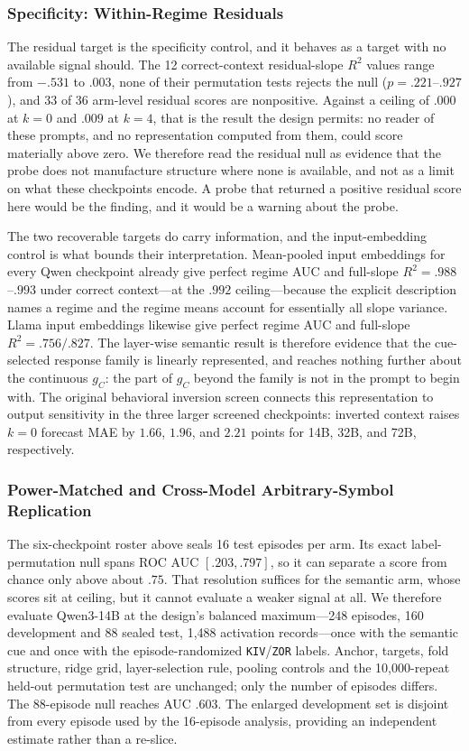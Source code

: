 \subsubsection{Specificity: Within-Regime Residuals}
The residual target is the specificity control, and it behaves as a target with
no available signal should. The 12 correct-context residual-slope $R^2$ values
range from $-.531$ to $.003$, none of their permutation tests rejects the null
($p=.221$--$.927$), and 33 of 36 arm-level residual scores are nonpositive.
Against a ceiling of $.000$ at $k=0$ and $.009$ at $k=4$, that is the result the
design permits: no reader of these prompts, and no representation computed from
them, could score materially above zero. We therefore read the residual null as
evidence that the probe does not manufacture structure where none is available,
and not as a limit on what these checkpoints encode. A probe that returned a
positive residual score here would be the finding, and it would be a warning
about the probe.

The two recoverable targets do carry information, and the input-embedding control
is what bounds their interpretation. Mean-pooled input embeddings for every Qwen
checkpoint already give perfect regime AUC and full-slope $R^2=.988$--$.993$ under
correct context---at the $.992$ ceiling---because the explicit description names a
regime and the regime means account for essentially all slope variance. Llama
input embeddings likewise give perfect regime AUC and full-slope $R^2=.756/.827$.
The layer-wise semantic result is therefore evidence that the cue-selected
response family is linearly represented, and reaches nothing further about the
continuous $g_C$: the part of $g_C$ beyond the family is not in the prompt to
begin with. The original behavioral inversion screen connects this representation
to output sensitivity in the three larger screened checkpoints: inverted context
raises $k=0$ forecast MAE by $1.66$, $1.96$, and $2.21$ points for 14B, 32B, and
72B, respectively.

\subsubsection{Power-Matched and Cross-Model Arbitrary-Symbol Replication}
\label{app:coin-city-probe-power}

The six-checkpoint roster above seals 16 test episodes per arm. Its exact
label-permutation null spans ROC AUC $[.203,.797]$, so it can separate a score
from chance only above about $.75$. That resolution suffices for the semantic arm,
whose scores sit at ceiling, but it cannot evaluate a weaker signal at all. We
therefore evaluate Qwen3-14B at the design's balanced maximum---248
episodes, 160 development and 88 sealed test, 1,488 activation records---once with
the semantic cue and once with the episode-randomized \texttt{KIV}/\texttt{ZOR}
labels. Anchor, targets, fold structure, ridge grid, layer-selection rule, pooling
controls and the 10,000-repeat held-out permutation test are unchanged; only the
number of episodes differs. The 88-episode null reaches AUC $.603$. The enlarged
development set is disjoint from every episode used by the 16-episode analysis,
providing an independent estimate rather than a re-slice.

